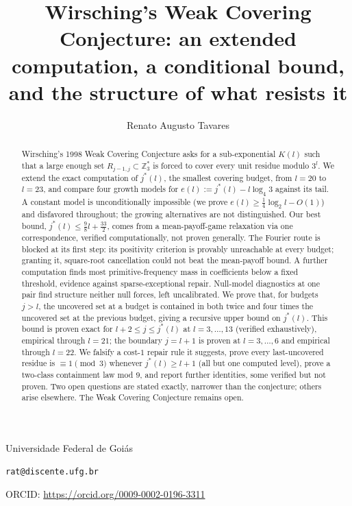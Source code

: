 \documentclass[11pt]{amsart}
\title[Wirsching's Weak Covering Conjecture]{Wirsching's Weak Covering Conjecture: an extended
computation, a conditional bound, and the structure of what resists it}
\author{Renato Augusto Tavares}
\theoremstyle{plain}
\theoremstyle{definition}
\theoremstyle{remark}
\newcommand{\Z}{\mathbb{Z}}
\begin{document}
\maketitle

\vspace{-2.5em}
\begin{center}
\normalsize Universidade Federal de Goi\'as \par
\texttt{rat@discente.ufg.br} \par
ORCID: \url{https://orcid.org/0009-0002-0196-3311}
\end{center}

\begin{abstract}
Wirsching's 1998 Weak Covering Conjecture asks for a sub-exponential $K(l)$ such that a large
enough set $R_{j-1,j}\subset\Z_3^*$ is forced to cover every unit residue modulo $3^l$. We extend
the exact computation of $j^*(l)$, the smallest covering budget, from $l=20$ to $l=23$, and
compare four growth models for $e(l):=j^*(l)-l\log_4 3$ against its tail. A constant model is
unconditionally impossible (we prove $e(l)\ge\tfrac14\log_2l-O(1)$) and disfavored throughout;
the growing alternatives are not distinguished. Our best bound,
$j^*(l)\le\tfrac98l+\tfrac{33}2$, comes from a mean-payoff-game relaxation via one correspondence,
verified computationally, not proven generally. The Fourier route is blocked at its first step:
its positivity criterion is provably unreachable at every budget; granting it, square-root
cancellation could not beat the mean-payoff bound. A further computation finds most
primitive-frequency mass in coefficients below a fixed threshold, evidence against
sparse-exceptional repair. Null-model
diagnostics at one pair find structure neither null forces, left uncalibrated. We prove
that, for budgets $j>l$, the uncovered set at a budget is contained in both twice and four times
the uncovered set at the previous budget, giving a recursive upper bound on $j^*(l)$. This bound
is proven exact for $l+2\le j\le j^*(l)$ at $l=3,\dots,13$ (verified exhaustively), empirical
through $l=21$; the boundary $j=l+1$ is proven at $l=3,\dots,6$ and empirical through $l=22$. We
falsify a cost-$1$
repair rule it suggests, prove every last-uncovered residue is $\equiv1\pmod3$ whenever
$j^*(l)\ge l+1$ (all but one computed level), prove a two-class containment law mod $9$, and
report further identities, some verified but not proven. Two open questions are
stated exactly, narrower than the conjecture; others arise elsewhere. The Weak Covering
Conjecture remains open.
\end{abstract}
\end{document}
